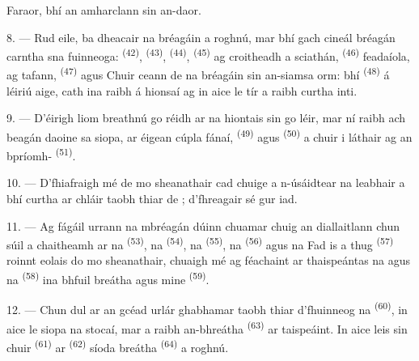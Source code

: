 Faraor, bhí an amharclann sin an-daor.

8. --- Rud eile, ba dheacair na bréagáin a roghnú, mar bhí gach cineál bréagán
carntha sna fuinneoga:  \textsuperscript{(42)},
 \textsuperscript{(43)},  \textsuperscript{(44)},
 \textsuperscript{(45)} ag croitheadh a sciathán,  \textsuperscript{(46)} feadaíola,  ag tafann,
 \textsuperscript{(47)} agus  Chuir ceann
de na bréagáin sin an-siamsa orm: bhí 
\textsuperscript{(48)} á léiriú aige, cath ina raibh  á hionsaí ag
 in aice le tír a raibh  curtha
inti.


9. --- D'éirigh liom breathnú go réidh ar na hiontais sin go léir, mar ní raibh ach
beagán daoine sa siopa, ar éigean cúpla fánaí,  \textsuperscript{(49)}
agus  \textsuperscript{(50)} a chuir  i
láthair ag an bpríomh- \textsuperscript{(51)}.

10. --- D'fhiafraigh mé de mo sheanathair cad chuige a n-úsáidtear na leabhair a bhí
curtha ar chláir taobh thiar de ; d'fhreagair sé gur
 iad.

\VUsaut{3.6mm}
\VUsaut{2.8mm}

11. --- Ag fágáil urrann na mbréagán dúinn chuamar chuig an diallaitlann chun
súil a chaitheamh ar na  \textsuperscript{(53)}, na
 \textsuperscript{(54)}, na 
\textsuperscript{(55)}, na  \textsuperscript{(56)} agus na
 Fad is a thug 
\textsuperscript{(57)} roinnt eolais do mo sheanathair, chuaigh mé ag féachaint ar
thaispeántas na  agus na 
\textsuperscript{(58)} ina bhfuil  breátha agus
 mine \textsuperscript{(59)}.

12. --- Chun dul ar an gcéad urlár ghabhamar taobh thiar d'fhuinneog na
 \textsuperscript{(60)}, in aice le siopa na stocaí, mar a raibh
 an-bhreátha \textsuperscript{(63)} ar taispeáint. In aice leis sin
chuir  \textsuperscript{(61)} ar 
\textsuperscript{(62)}  síoda breátha \textsuperscript{(64)} a
roghnú.

